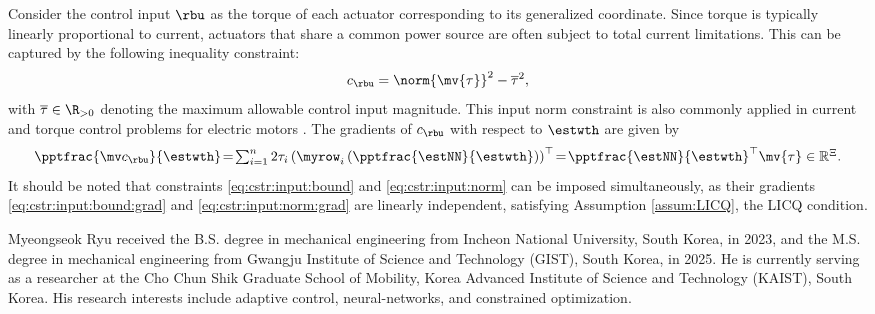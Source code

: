 \documentclass[lettersize,journal]{IEEEtran}
\newcommand*{\template}{template}
\begin{document}
Consider the control input $\rbu$ as the torque of each actuator corresponding to its generalized coordinate. Since torque is typically linearly proportional to current, actuators that share a common power source are often subject to total current limitations. This can be captured by the following inequality constraint: 
\begin{equation}
    c_{\rbu}
    =
    \norm{
        \mv{\tau}
    }^2 
    -
    \overline\tau^2
    ,
    \label{eq:cstr:input:norm}
\end{equation}
with $\overline\tau\in\R_{>0}$ denoting the maximum allowable control input magnitude. This input norm constraint is also commonly applied in current and torque control problems for electric motors \cite{Choi:2024aa}.
The gradients of $c_{\rbu}$ with respect to $\estwth$ are given by
\begin{equation}
    \pptfrac{\mv c_{\rbu}}{\estwth}
    \!=\! 
    \textstyle\sum_{i=1}^n 2\tau_{i} 
    \left(
        \myrow_i
        \left(
            \pptfrac{\estNN}{\estwth}
        \right)
    \right)^\top  
    \!=\! 
    {\pptfrac{\estNN}{\estwth}}^\top
    \mv{\tau}
    \in \mathbb R^{\Xi}.
    \label{eq:cstr:input:norm:grad}
\end{equation}
It should be noted that constraints \eqref{eq:cstr:input:bound} and \eqref{eq:cstr:input:norm} can be imposed simultaneously, as their gradients \eqref{eq:cstr:input:bound:grad} and \eqref{eq:cstr:input:norm:grad} are linearly independent, satisfying Assumption \ref{assum:LICQ}, \ie the LICQ condition.




\begin{IEEEbiography}{Myeongseok Ryu}
    received the B.S. degree in mechanical engineering from Incheon National University, South Korea, in 2023, and the M.S. degree in mechanical engineering from Gwangju Institute of Science and Technology (GIST), South Korea, in 2025. 
    He is currently serving as a researcher at the Cho Chun Shik Graduate School of Mobility, Korea Advanced Institute of Science and Technology (KAIST), South Korea.
    His research interests include adaptive control, neural-networks, and constrained optimization.
\end{IEEEbiography}
\end{document}

